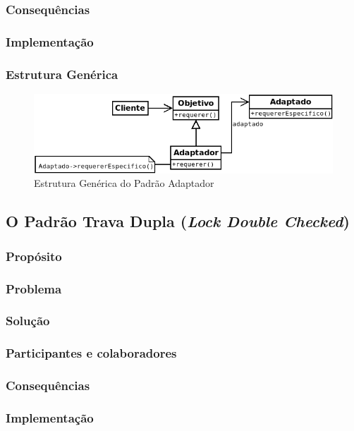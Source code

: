 \subsubsection{Consequências}
\subsubsection{Implementação}
\subsubsection{Estrutura Genérica}

\begin{figure}[h]
\begin{center}
\includegraphics[scale=0.6]{adaptador.png}
\caption{Estrutura Genérica do Padrão Adaptador}\label{fig:adaptador}
\end{center}
\end{figure}

\subsection{O Padrão Trava Dupla (\textit{Lock Double Checked})}
\subsubsection{Propósito}
\subsubsection{Problema}
\subsubsection{Solução}
\subsubsection{Participantes e colaboradores}
\subsubsection{Consequências}
\subsubsection{Implementação}
